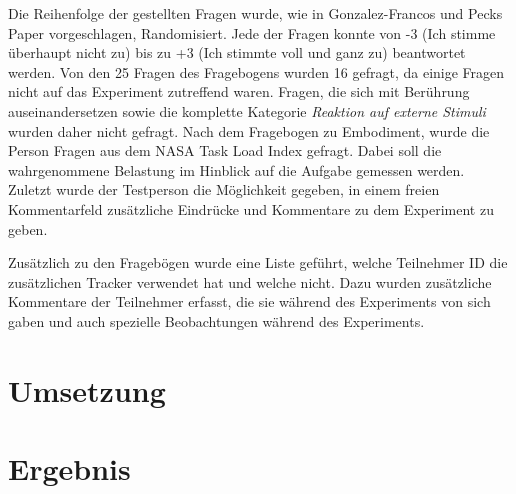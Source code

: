 Die Reihenfolge der gestellten Fragen wurde, wie in Gonzalez-Francos und Pecks Paper vorgeschlagen, Randomisiert. Jede der Fragen konnte von -3 (Ich stimme überhaupt nicht zu) bis zu +3 (Ich stimmte voll und ganz zu) beantwortet werden.
Von den 25 Fragen des Fragebogens wurden 16 gefragt, da einige Fragen nicht auf das Experiment zutreffend waren. Fragen, die sich mit Berührung auseinandersetzen sowie die komplette Kategorie \textit{Reaktion auf externe Stimuli} wurden daher nicht gefragt.
Nach dem Fragebogen zu Embodiment, wurde die Person Fragen aus dem NASA Task Load Index \cite{HART1988} gefragt. Dabei soll die wahrgenommene Belastung im Hinblick auf die Aufgabe gemessen werden.
Zuletzt wurde der Testperson die Möglichkeit gegeben, in einem freien Kommentarfeld zusätzliche Eindrücke und Kommentare zu dem Experiment zu geben.

Zusätzlich zu den Fragebögen wurde eine Liste geführt, welche Teilnehmer ID die zusätzlichen Tracker verwendet hat und welche nicht. Dazu wurden zusätzliche Kommentare der Teilnehmer erfasst, die sie während des Experiments von sich gaben und auch spezielle Beobachtungen während des Experiments.

\section{Umsetzung}

\section{Ergebnis}
